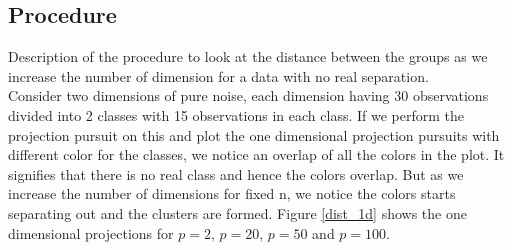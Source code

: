 \documentclass[12]{article}
\begin{document}
\subsection{Procedure}
{\color{red} Description of the procedure to look at the distance between the groups as we increase the number of dimension for a data with no real separation.} \\
Consider two dimensions of pure noise, each dimension having 30 observations divided into 2 classes with 15 observations in each class. If we perform the projection pursuit on this and plot the one dimensional projection pursuits with different color for the classes, we notice an overlap of all the colors in the plot. It signifies that there is no real class and hence the colors overlap. But as we increase the number of dimensions for fixed n, we notice the colors starts separating out and the clusters are formed. Figure \ref{dist_1d} shows the one dimensional projections for $p=2$, $p=20$, $p=50$ and $p=100$. \\
\end{document}
